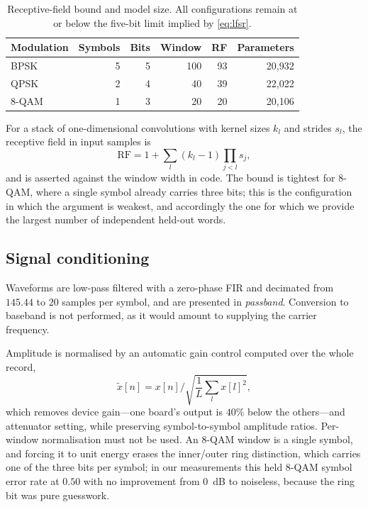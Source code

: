 \documentclass[journal]{IEEEtran}   %
\begin{document}
\begin{table}[!t]
\caption{Receptive-field bound and model size. All configurations remain at or
below the five-bit limit implied by \eqref{eq:lfsr}.}
\label{tab:bound}
\centering
\begin{tabular}{lrrrrr}
\toprule
Modulation & Symbols & Bits & Window & RF & Parameters \\
\midrule
BPSK  & 5 & 5 & 100 & 93 & 20{,}932 \\
QPSK  & 2 & 4 &  40 & 39 & 22{,}022 \\
8-QAM & 1 & 3 &  20 & 20 & 20{,}106 \\
\bottomrule
\end{tabular}
\end{table}

For a stack of one-dimensional convolutions with kernel sizes $k_l$ and strides
$s_l$, the receptive field in input samples is
\begin{equation}
\mathrm{RF} = 1 + \sum_{l} (k_l - 1)\prod_{j<l} s_j ,
\label{eq:rf}
\end{equation}
and is asserted against the window width in code. The bound is tightest for
8-QAM, where a single symbol already carries three bits; this is the
configuration in which the argument is weakest, and accordingly the one for
which we provide the largest number of independent held-out words.

\subsection{Signal conditioning}
Waveforms are low-pass filtered with a zero-phase FIR and decimated from
$145.44$ to $20$ samples per symbol, and are presented in \emph{passband}.
Conversion to baseband is not performed, as it would amount to supplying the
carrier frequency.

Amplitude is normalised by an automatic gain control computed over the whole
record,
\begin{equation}
\tilde{x}[n] = x[n] \big/ \sqrt{\textstyle\frac{1}{L}\sum_{l} x[l]^2 } ,
\label{eq:agc}
\end{equation}
which removes device gain---one board's output is $40\%$ below the
others---and attenuator setting, while preserving symbol-to-symbol amplitude
ratios. Per-window normalisation must not be used. An 8-QAM window is a single
symbol, and forcing it to unit energy erases the inner/outer ring distinction,
which carries one of the three bits per symbol; in our measurements this held
8-QAM symbol error rate at $0.50$ with no improvement from $0$~dB to noiseless,
because the ring bit was pure guesswork.
\end{document}
